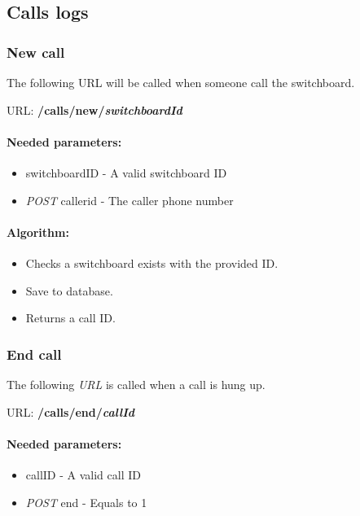 \subsection{Calls logs}
\subsubsection{New call}
The following URL will be called when someone call the switchboard.
\newline

URL: \textbf{/calls/new/{\textit{switchboardId}}}

\paragraph{Needed parameters:}
\begin{itemize}
\item {switchboardID} - A valid switchboard ID
\item \textit{POST} {callerid} - The caller phone number
\end{itemize}


\paragraph{Algorithm:}
\begin{itemize}
	\item Checks a switchboard exists with the provided ID.
	\item Save to database.
	\item Returns a call ID.

\end{itemize}


\subsubsection{End call}
The following \textit{URL} is called when a call is hung up. 
\newline

URL: \textbf{/calls/end/{\textit{callId}}}


\paragraph{Needed parameters:}
\begin{itemize}
\item {callID} - A valid call ID
\item \textit{POST} {end} - Equals to 1
\end{itemize}


